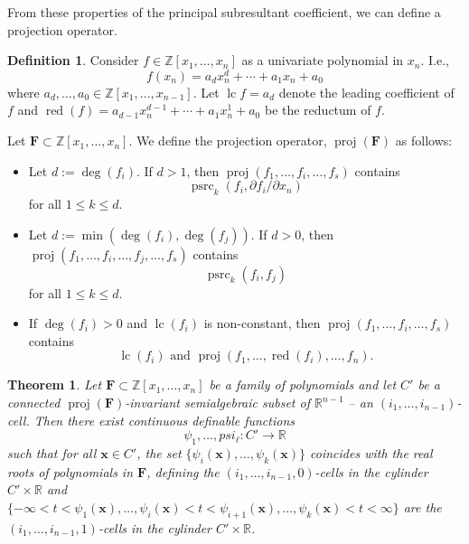 \documentclass[
]{book}
\newtheorem{theorem}{Theorem}[chapter]
\theoremstyle{definition}
\newtheorem{definition}{Definition}[chapter]
\theoremstyle{definition}
\theoremstyle{definition}
\theoremstyle{definition}
\theoremstyle{remark}
\begin{document}
From these properties of the principal subresultant coefficient, we can define a projection operator.

\begin{definition}

Consider \(f \in \mathbb{Z}[x_1,\ldots,x_n]\) as a univariate polynomial in \(x_n\). I.e.,
\[
f(x_n) = a_d x_n^d + \cdots + a_1 x_n + a_0
\]
where \(a_d,\ldots,a_0 \in \mathbb{Z}[x_1,\ldots,x_{n-1}]\).
Let \(\operatorname{lc}{f} = a_d\) denote the leading coefficient of \(f\) and \(\operatorname{red}(f) = a_{d-1}x_n^{d-1} + \cdots + a_1 x_n^1 + a_0\) be the reductum of \(f\).

Let \(\mathbf{F} \subset \mathbb{Z}[x_1,\ldots,x_n]\). We define the projection operator, \(\operatorname{proj}(\mathbf{F})\) as follows:

\begin{itemize}
\item
  Let \(d := \deg(f_i)\). If \(d > 1\), then \(\operatorname{proj}(f_1,\ldots,f_i,\ldots,f_s)\) contains
  \[
  \operatorname{psrc}_k(f_i, \partial f_i / \partial x_n)
  \]
  for all \(1\le k \le d\).
\item
  Let \(d := \min(\deg(f_i), \deg(f_j))\). If \(d > 0\), then \(\operatorname{proj}(f_1,\ldots,f_i,\ldots,f_j,\ldots,f_s)\) contains
  \[
  \operatorname{psrc}_k(f_i, f_j)
  \]
  for all \(1 \le k \le d\).
\item
  If \(\deg(f_i) > 0\) and \(\operatorname{lc}(f_i)\) is non-constant, then \(\operatorname{proj}(f_1,\ldots,f_i,\ldots,f_s)\) contains
  \[
  \operatorname{lc}(f_i) \text{ and } \operatorname{proj}(f_1,\ldots,\operatorname{red}(f_i),\ldots,f_n).
  \]
\end{itemize}

\end{definition}

\begin{theorem}
\protect\hypertarget{thm:cad-lift}{}\label{thm:cad-lift}\citep[Theorem 2.19]{coste2000}
Let \(\mathbf{F} \subset \mathbb{Z}[x_1,\ldots,x_n]\) be a family of polynomials and let \(C'\) be a connected \(\operatorname{proj}(\mathbf{F})\)-invariant semialgebraic subset of \(\mathbb{R}^{n-1}\) -- an \((i_1,\ldots,i_{n-1})\)-cell.
Then there exist continuous definable functions
\[
\psi_1,\ldots, psi_\ell : C' \to \mathbb{R}
\]
such that for all \(\mathbf{x} \in C'\), the set \(\{ \psi_i(\mathbf{x}), \ldots, \psi_k(\mathbf{x}) \}\) coincides with the real roots of polynomials in \(\mathbf{F}\), defining the \((i_1,\ldots,i_{n-1},0)\)-cells in the cylinder \(C' \times \mathbb{R}\) and \(\{ -\infty < t < \psi_1(\mathbf{x}), \ldots, \psi_i(\mathbf{x}) < t < \psi_{i+1}(\mathbf{x}), \ldots, \psi_k(\mathbf{x}) < t < \infty \}\) are the \((i_1,\ldots, i_{n-1},1)\)-cells in the cylinder \(C' \times \mathbb{R}\).
\end{theorem}
\end{document}
